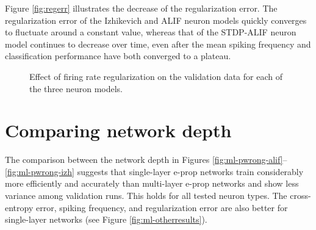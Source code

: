 		Figure \ref{fig:regerr} illustrates the decrease of the regularization error.
		The regularization error of the Izhikevich and ALIF neuron models quickly converges to fluctuate around a constant value, whereas that of the STDP-ALIF neuron model continues to decrease over time, even after the mean spiking frequency and classification performance have both converged to a plateau.

		\begin{figure}[bth]
		    \myfloatalign
		     \quad
		    \caption[Single-layer firing rate regularization per neuron model]{Effect of firing rate regularization on the validation data for each of the three neuron models.}\label{fig:sl-reg}
		\end{figure}

\section{Comparing network depth}
The comparison between the network depth in Figures \ref{fig:ml-pwrong-alif}--\ref{fig:ml-pwrong-izh} suggests that single-layer e-prop networks train considerably more efficiently and accurately than multi-layer e-prop networks and show less variance among validation runs.
This holds for all tested neuron types.
The cross-entropy error, spiking frequency, and regularization error are also better for single-layer networks (see Figure \ref{fig:ml-otherresults}).

